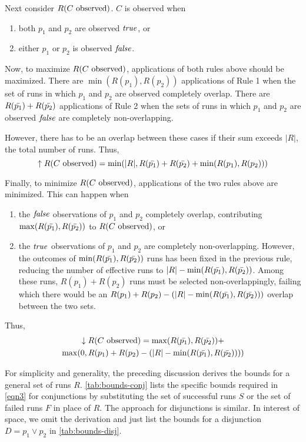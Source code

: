 Next consider $R(\text{$C$ observed})$.  $C$ is observed when
\begin{enumerate}
\item both $p_1$ and $p_2$ are observed $\mathit{true}$, or
\item either $p_1$ or $p_2$ is observed $\mathit{false}$.
\end{enumerate}

Now, to maximize $R(\text{$C$ observed})$, applications of both rules above should be
maximized.
There are $\min(R(p_1), R(p_2))$ applications of Rule 1 when the set
of runs in which $p_1$ and $p_2$ are observed completely overlap.
There are $R(\text{$\bar{p_1}$}) + R(\text{$\bar{p_2}$})$ applications of Rule
2 when the sets of runs in which $p_1$ and $p_2$ are observed $\mathit{false}$ are
completely non-overlapping.

However, there has to be an overlap between these cases if their sum exceeds
$|R|$, the total number of runs.  Thus,
\begin{equation}
  \uparrow R(\text{$C$ observed}) = \min(|R|, R(\text{$\bar{p_1}$}) + R(\text{$\bar{p_2}$})
                   + \min(R(p_1), R(p_2)))
\end{equation}

Finally, to minimize $R(\text{$C$ observed})$, applications of the two rules above are
minimized.  This can happen when
\begin{enumerate}
\item the $\mathit{false}$ observations of $p_1$ and $p_2$ completely overlap, contributing
$\max(R(\text{$\bar{p_1}$}), R(\text{$\bar{p_2}$}))$ to $R(\text{$C$ observed})$, or
\item the $\mathit{true}$ observations of $p_1$ and $p_2$ are completely non-overlapping.
However, the outcomes of $\min(R(\text{$\bar{p_1}$}), R(\text{$\bar{p_2}$}))$ runs has
been fixed in the previous rule, reducing the number of effective runs to
$|R| - \min(R(\text{$\bar{p_1}$}), R(\text{$\bar{p_2}$}))$.  Among these runs, $R(p_1) + R(p_2)$
runs must be selected non-overlappingly, failing which there would be an
$R(p_1) + R(p_2) - (|R| - \min(R(\text{$\bar{p_1}$}), R(\text{$\bar{p_2}$})))$ overlap
between the two sets.
\end{enumerate}

Thus,
\begin{multline}
  \downarrow R(\text{$C$ observed}) = \max(R(\text{$\bar{p_1}$}), R(\text{$\bar{p_2}$})) + \\
  \max(0, R(p_1) + R(p_2) - (|R| - \min(R(\text{$\bar{p_1}$}), R(\text{$\bar{p_2}$}))))
\end{multline}

For simplicity and generality, the preceding discussion derives the
bounds for a general set of runs $R$.  \autoref{tab:bounds-conj} lists
the specific bounds required in \autoref{eqn3} for conjunctions by
substituting the set of successful runs $S$ or the set of failed runs
$F$ in place of $R$.  The approach for disjunctions is similar.  In
interest of space, we omit the derivation and just list the bounds for
a disjunction $D = p_1 \vee p_2$ in \autoref{tab:bounds-disj}.

